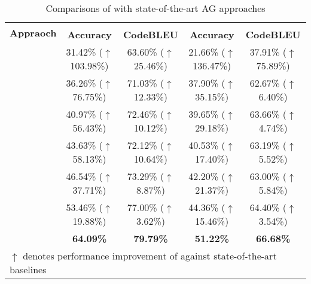 \begin{table*}[t]
\footnotesize
  \centering
  \caption{Comparisons of \toolname{} with state-of-the-art AG approaches}
    \begin{tabular}{c|cc|cc}

    \toprule
    \multirow{2}[4]{*}{\textbf{Appraoch}} & \multicolumn{2}{c|}{\olddata{}} & \multicolumn{2}{c}{\newdata{}} \\
\cmidrule{2-5}          & \textbf{Accuracy} & \textbf{CodeBLEU} & \multicolumn{1}{c}{\textbf{Accuracy}} & \textbf{CodeBLEU} \\
    \midrule
    \atla{} & 31.42\% ($\uparrow$103.98\%) & 63.60\% ($\uparrow$25.46\%) & 21.66\% ($\uparrow$136.47\%) & 37.91\% ($\uparrow$75.89\%) \\
    \irar{} & 36.26\% ($\uparrow$76.75\%) & 71.03\% ($\uparrow$12.33\%) & 37.90\% ($\uparrow$35.15\%) & 62.67\% ($\uparrow$6.40\%) \\
    \rah{} & 40.97\% ($\uparrow$56.43\%) & 72.46\% ($\uparrow$10.12\%) & 39.65\% ($\uparrow$29.18\%) & 63.66\% ($\uparrow$4.74\%) \\
    \rann{} & 43.63\% ($\uparrow$58.13\%) & 72.12\% ($\uparrow$10.64\%) & 40.53\% ($\uparrow$17.40\%) & 63.19\% ($\uparrow$5.52\%) \\
    \inte{} & 46.54\% ($\uparrow$37.71\%) & 73.29\% ($\uparrow$8.87\%) & 42.20\% ($\uparrow$21.37\%) & 63.00\% ($\uparrow$5.84\%) \\
    \edit{} & 53.46\% ($\uparrow$19.88\%) & 77.00\% ($\uparrow$3.62\%) & 44.36\% ($\uparrow$15.46\%) & 64.40\% ($\uparrow$3.54\%) \\
    \midrule
    \toolname{} & \textbf{64.09\%} & \textbf{79.79\%} & \multicolumn{1}{c}{\textbf{51.22\%}} & \textbf{66.68\%} \\
    \bottomrule
      
     \multicolumn{5}{l}{$\uparrow$ denotes performance improvement of \toolname{} against state-of-the-art baselines}
    \end{tabular}
  \label{tab:rq1}
\end{table*}%

